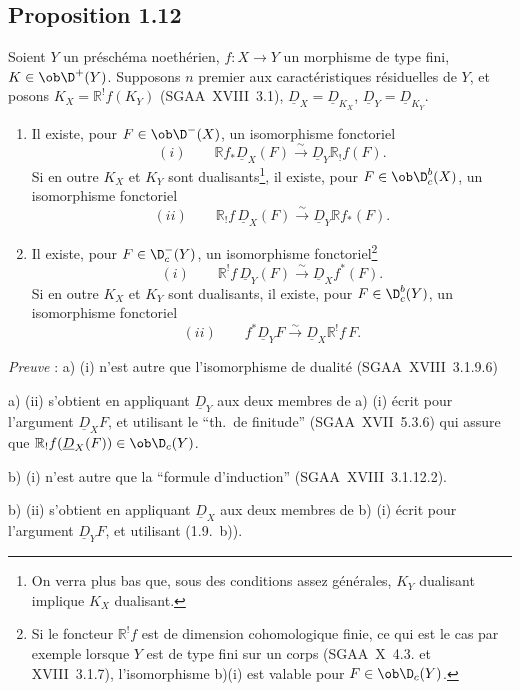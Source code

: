 \subsection*{Proposition 1.12}
Soient $Y$ un préschéma noethérien, $f : X \to Y$ un morphisme de type fini, $K \in \ob \D^{+}(Y)$. Supposons $n$ premier aux caractéristiques résiduelles de $Y$, et posons $K_X = \mathbb{R}^{!}f(K_Y)$ (SGAA~XVIII~3.1), $\underline{D}_X = \underline{D}_{K_X}$, $\underline{D}_Y = \underline{D}_{K_Y}$.
\begin{enumerate}
\item[a)] Il existe, pour $F \in \ob \D^{-}(X)$, un isomorphisme fonctoriel
\[
(i) \qquad \mathbb{R} f_{*} \underline{D}_X(F) \xrightarrow{\sim} \underline{D}_Y \mathbb{R}_{!}f(F).
\]
Si en
outre $K_X$ et $K_Y$ sont dualisants\footnote{On verra plus bas que, sous des conditions assez générales, $K_Y$ dualisant implique $K_X$ dualisant.}, il existe, pour $F \in \ob \D_c^{b}(X)$, un isomorphisme fonctoriel
\[
(ii) \qquad \mathbb{R}_{!}f \, \underline{D}_X(F) \xrightarrow{\sim} \underline{D}_Y \mathbb{R} f_{*}(F).
\]
\item[b)] Il existe, pour $F \in \D_c^{-}(Y)$, un isomorphisme fonctoriel\footnote{Si le foncteur $\mathbb{R}^{!}f$ est de dimension cohomologique finie, ce qui est le cas par exemple lorsque $Y$ est de type fini sur un corps (SGAA~X~4.3. et XVIII~3.1.7), l'isomorphisme b)(i) est valable pour $F \in \ob \D_c(Y)$.}
\[
(i) \qquad \mathbb{R}^{!}f \, \underline{D}_Y(F) \xrightarrow{\sim} \underline{D}_X f^{*}(F).
\]
Si en outre $K_X$ et $K_Y$ sont dualisants\footnotemark[3], il existe, pour $F \in \D_c^{b}(Y)$, un isomorphisme fonctoriel
\[
(ii) \qquad f^{*} \underline{D}_Y F \xrightarrow{\sim} \underline{D}_X \mathbb{R}^{!}f \, F.
\]
\end{enumerate}

\emph{Preuve} : a) (i) n'est autre que l'isomorphisme de dualité (SGAA~XVIII~3.1.9.6)

a) (ii) s'obtient en appliquant $\underline{D}_Y$ aux deux membres de a) (i) écrit pour l'argument $\underline{D}_X F$, et utilisant le ``th.~de finitude'' (SGAA~XVII~5.3.6) qui assure que $\mathbb{R}_{!}f(\underline{D}_X(F)) \in \ob \D_c(Y)$.

b) (i) n'est autre que la ``formule d'induction'' (SGAA~XVIII~3.1.12.2).

b) (ii) s'obtient en appliquant $\underline{D}_X$ aux deux membres de b) (i) écrit pour l'argument $\underline{D}_Y F$, et utilisant (1.9.~b)).

